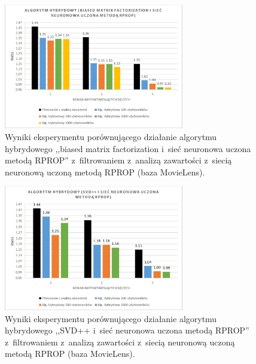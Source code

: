 \documentclass[twoside]{iisthesis}
\begin{document}
		\begin{figure}
			\centering
			\includegraphics[width=0.7\textwidth]{ml_exphybrid1_5}			
			\caption{Wyniki eksperymentu porównującego działanie algorytmu hybrydowego ,,biased matrix factorization i~sieć neuronowa uczona metodą RPROP'' z~filtrowaniem z~analizą zawartości z~siecią neuronową uczoną metodą RPROP (baza MovieLens).}
			\label{fig:ml_exphybrid1_5}
		\end{figure}
		
		\begin{figure}
			\centering
			\includegraphics[width=0.7\textwidth]{ml_exphybrid1_6}			
			\caption{Wyniki eksperymentu porównującego działanie algorytmu hybrydowego ,,SVD++ i~sieć neuronowa uczona metodą RPROP'' z~filtrowaniem z~analizą zawartości z~siecią neuronową uczoną metodą RPROP (baza MovieLens).}
			\label{fig:ml_exphybrid1_6}
		\end{figure}
		
\end{document}

